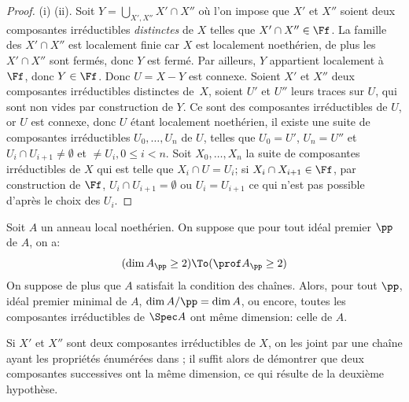 \begin{proof}
(i) \ALORS (ii). Soit $Y=\bigcup_{X', X''} X'\cap X''$ o\`u l'on impose que $X'$ et $X''$ soient deux composantes irr\'eductibles \emph{distinctes} de $X$ telles que $X'\cap X'' \in \Ff$. La famille des $X'\cap X''$ est localement finie car $X$ est localement noeth\'erien, de plus les $X'\cap X''$ sont ferm\'es, donc $Y$ est ferm\'e. Par ailleurs, $Y$ appartient localement \`a $\Ff$, donc $Y\in \Ff$. Donc $U=X-Y$ est connexe. Soient $X'$ et $X''$ deux composantes irr\'eductibles distinctes de~$X$, soient $U'$ et $U''$ leurs traces sur $U$, qui sont non vides par construction de $Y$. Ce sont des composantes irr\'eductibles de $U$, or $U$ est connexe, donc $U$ \'etant localement noeth\'erien, il existe une suite de composantes irr\'eductibles $U_0, \ldots, U_n$ de $U$, telles que $U_0=U'$, $U_n=U''$ et $U_{i}\cap U_{i+1}\neq \emptyset$ et $\neq U_{i}, 0\leq i < n$. Soit $X_0, \ldots, X_n$ la suite de composantes irr\'eductibles de $X$ qui est telle que $X_{i}\cap U=U_{i}$; si $X_{i}\cap X_{i+1}\in \Ff$, par construction de $\Ff$, $U_{i}\cap U_{i+1}=\emptyset$ ou $U_{i}=U_{i+1}$ ce qui n'est pas possible d'apr\`es le choix des $U_{i}$.
\end{proof}

\begin{corollaire} \label{III.3.9}
Soit $A$ un anneau local noeth\'erien. On suppose que pour tout id\'eal premier $\pp$ de $A$, on a:
\[
(\dim A_\pp \geq 2) \To (\prof A_\pp \geq 2)
\]
On suppose de plus que $A$ satisfait la condition des cha\^ines. Alors, pour tout $\pp$, id\'eal premier minimal de $A$, $\dim A/\pp =\dim A$, ou encore, toutes les composantes irr\'eductibles de $\Spec A$ ont m\^eme dimension: celle de $A$.
\end{corollaire}

Si $X'$ et $X''$ sont deux composantes irr\'eductibles de $X$, on les joint par une cha\^ine ayant les propri\'et\'es \'enum\'er\'ees dans \ignorespaces {}; il suffit alors de d\'emontrer que deux composantes successives ont la m\^eme dimension, ce qui r\'esulte de la deuxi\`eme hypoth\`ese.

